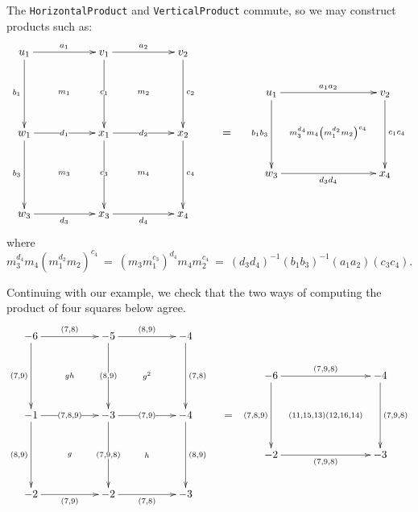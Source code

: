 \documentclass[a4paper,11pt]{report}
\begin{document}
{{\begin{Verbatim}[commandchars=!@B,fontsize=\small,frame=single,label=Example]
\end{Verbatim}
 The \texttt{HorizontalProduct} and \texttt{VerticalProduct} commute, so we may construct products such as: 
\[ \vcenter{\xymatrix @=2pc{ u_1 \ar[rr]^{a_1} \ar[dd]_{b_1} \ar@{}[ddrr]|{m_1}
&& v_1 \ar[rr]^{a_2} \ar[dd]|{c_1} \ar@{}[ddrr]|{m_2} && v_2 \ar[dd]^{c_2} & &
&&& \\ && && & & u_1 \ar[rrr]^{a_1a_2} \ar[dd]_{b_1b_3}
\ar@{}[ddrrr]|{m_3^{d_4}m_4\left(m_1^{d_2}m_2\right)^{c_4}} &&& v_2
\ar[dd]^{c_1c_4} \\ w_1 \ar[rr]|{d_1} \ar[dd]_{b_3} \ar@{}[ddrr]|{m_3} && x_1
\ar[rr]|{d_2} \ar[dd]|{c_3} \ar@{}[ddrr]|{m_4} && x_2 \ar[dd]^{c_4} &=& &&& \\
&& && & & w_3 \ar[rrr]_{d_3d_4} &&& x_4 \\ w_3 \ar[rr]_{d_3} && x_3
\ar[rr]_{d_4} && x_4 }} \]
 where 
\[ m_3^{d_4}m_4 (m_1^{d_2}m_2)^{c_4} ~=~ (m_3m_1^{c_3})^{d_4} m_4m_2^{c_4} ~=~
(d_3d_4)^{-1}(b_1b_3)^{-1}(a_1a_2)(c_3c_4). \]
 

 Continuing with our example, we check that the two ways of computing the
product of four squares below agree. 
\[ \vcenter{\xymatrix @=2pc{ -6 \ar[rr]^{(7,8)} \ar[dd]_{(7,9)} \ar@{}[ddrr]|{gh}
&& -5 \ar[rr]^{(8,9)} \ar[dd]|{(8,9)} \ar@{}[ddrr]|{g^2} && -4 \ar[dd]^{(7,8)}
& & &&& \\ && && & & -6 \ar[rrr]^{(7,9,8)} \ar[dd]_{(7,8,9)}
\ar@{}[ddrrr]|{(11,15,13)(12,16,14)} &&& -4 \ar[dd]^{(7,9,8)} \\ -1
\ar[rr]|{(7,8,9)} \ar[dd]_{(8,9)} \ar@{}[ddrr]|{g} && -3 \ar[rr]|{(7,9)}
\ar[dd]|{(7,9,8)} \ar@{}[ddrr]|{h} && -4 \ar[dd]^{(8,9)} &=& &&& \\ && && & &
-2 \ar[rrr]_{(7,9,8)} &&& -3 \\ -2 \ar[rr]_{(7,9)} && -2 \ar[rr]_{(7,8)} && -3
}} \]
 
\begin{Verbatim}[commandchars=!@B,fontsize=\small,frame=single,label=Example]
  

\end{Verbatim}}}
\end{document}
